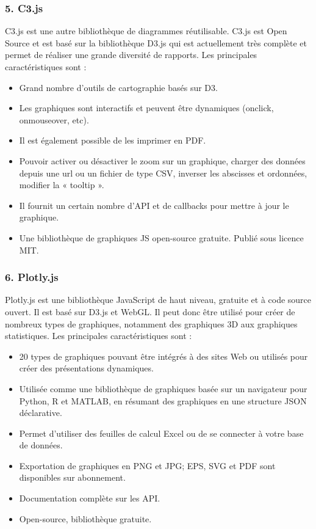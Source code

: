 \documentclass[french, a4paper, 12pt]{report}
\begin{document}
\subsubsection{5. C3.js}

C3.js est une autre bibliothèque de diagrammes réutilisable. C3.js est Open Source et est basé sur la bibliothèque D3.js qui est actuellement très complète et permet de réaliser une grande diversité de rapports. Les principales caractéristiques sont :
\begin{itemize}
\item \textbf{} Grand nombre d’outils de cartographie basés sur D3.
\item \textbf{} Les graphiques sont interactifs et peuvent être dynamiques (onclick, onmouseover, etc). 
\item \textbf{} Il est également possible de les imprimer en PDF.
\item \textbf{} Pouvoir activer ou désactiver le zoom sur un graphique, charger des données depuis une url ou un fichier de type CSV, inverser les abscisses et ordonnées, modifier la « tooltip ».
\item \textbf{} Il fournit un certain nombre d'API et de callbacks pour mettre à jour le graphique.
\item \textbf{} Une bibliothèque de graphiques JS open-source gratuite. Publié sous licence MIT.
\end{itemize} 

\subsubsection{6. Plotly.js}
Plotly.js est une bibliothèque JavaScript de haut niveau, gratuite et à code source ouvert. Il est basé sur D3.js et WebGL. Il peut donc être utilisé pour créer de nombreux types de graphiques, notamment des graphiques 3D aux graphiques statistiques. Les principales caractéristiques sont : 
\begin{itemize}
\item \textbf{} 20 types de graphiques pouvant être intégrés à des sites Web ou utilisés pour créer des présentations dynamiques.
\item \textbf{} Utilisée comme une bibliothèque de graphiques basée sur un navigateur pour Python, R et MATLAB, en résumant des graphiques en une structure JSON déclarative.
\item \textbf{} Permet d'utiliser des feuilles de calcul Excel ou de se connecter à votre base de données.
\item \textbf{} Exportation de graphiques en PNG et JPG; EPS, SVG et PDF sont disponibles sur abonnement.
\item \textbf{} Documentation complète sur les API.
\item \textbf{} Open-source, bibliothèque gratuite.
\end{itemize} 
\end{document}
